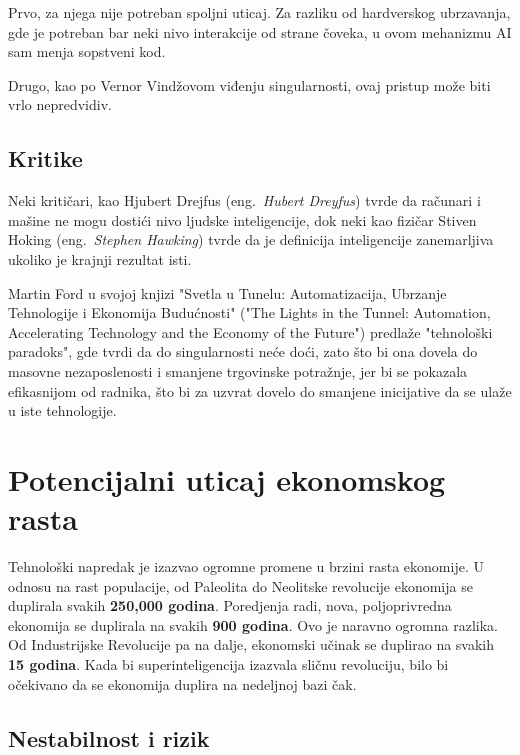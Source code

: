 \documentclass[a4paper]{article}
\begin{document}
Prvo, za njega nije potreban spoljni uticaj. Za razliku od hardverskog ubrzavanja, gde je potreban bar neki nivo interakcije od strane čoveka, u ovom mehanizmu AI sam menja sopstveni kod.

Drugo, kao po Vernor Vindžovom viđenju singularnosti, ovaj pristup može biti vrlo nepredvidiv\cite{ref12}. 

\subsection{Kritike}

Neki kritičari, kao Hjubert Drejfus (eng.~{\em Hubert Dreyfus}) tvrde da računari i mašine ne mogu dostići nivo ljudske inteligencije, dok neki kao fizičar Stiven Hoking (eng.~{\em Stephen Hawking}) tvrde da je definicija inteligencije zanemarljiva ukoliko je krajnji rezultat isti. 

Martin Ford u svojoj knjizi "Svetla u Tunelu: Automatizacija, Ubrzanje Tehnologije i Ekonomija Budućnosti" ("The Lights in the Tunnel: Automation, Accelerating Technology and the Economy of the Future") predlaže "tehnološki paradoks", gde tvrdi da do singularnosti neće doći, zato što bi ona dovela do masovne nezaposlenosti i smanjene trgovinske potražnje, jer bi se pokazala efikasnijom od radnika, što bi za uzvrat dovelo do smanjene inicijative da se ulaže u iste tehnologije\cite{ref13}. 

\section{Potencijalni uticaj ekonomskog rasta}
\label{sec:potencijalni_uticaj}
\hfill

Tehnološki napredak je izazvao ogromne promene u brzini rasta ekonomije. U odnosu na rast populacije, od Paleolita do Neolitske revolucije ekonomija se duplirala svakih \textbf{250,000 godina}. Poredjenja radi, nova, poljoprivredna ekonomija se duplirala na svakih \textbf{900 godina}. Ovo je naravno ogromna razlika. Od Industrijske Revolucije pa na dalje, ekonomski učinak se duplirao na svakih \textbf{15 godina}. Kada bi superinteligencija izazvala sličnu revoluciju, bilo bi očekivano da se ekonomija duplira na nedeljnoj bazi čak.

\subsection{Nestabilnost i rizik}
\label{subsec:nestabilnost_i_rizik}
\hfill
\end{document}
